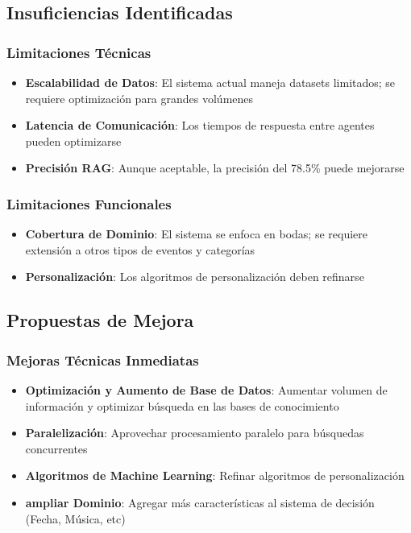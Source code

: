 \documentclass[runningheads,a4paper]{llncs}
\begin{document}
\subsection{Insuficiencias Identificadas}

\subsubsection{Limitaciones Técnicas}
\begin{itemize}
    \item \textbf{Escalabilidad de Datos}: El sistema actual maneja datasets limitados; se requiere optimización para grandes volúmenes
    \item \textbf{Latencia de Comunicación}: Los tiempos de respuesta entre agentes pueden optimizarse
    \item \textbf{Precisión RAG}: Aunque aceptable, la precisión del 78.5\% puede mejorarse
\end{itemize}

\subsubsection{Limitaciones Funcionales}
\begin{itemize}
    \item \textbf{Cobertura de Dominio}: El sistema se enfoca en bodas; se requiere extensión a otros tipos de eventos y categorías
    \item \textbf{Personalización}: Los algoritmos de personalización deben refinarse
\end{itemize}

\subsection{Propuestas de Mejora}

\subsubsection{Mejoras Técnicas Inmediatas}
\begin{itemize}
    \item \textbf{Optimización y Aumento de Base de Datos}: Aumentar volumen  de información y optimizar búsqueda en las bases de conocimiento
    \item \textbf{Paralelización}: Aprovechar procesamiento paralelo para búsquedas concurrentes
    \item \textbf{Algoritmos de Machine Learning}: Refinar algoritmos de personalización
    \item \textbf{ampliar Dominio}: Agregar más características al sistema de decisión (Fecha, Música, etc)
\end{itemize}
\end{document}

